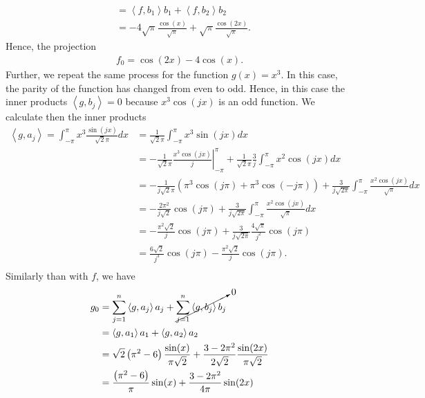 \begin{questions}
\begin{solution}
\begin{align*}
&=\left<f,b_1\right>b_1+\left<f,b_2\right>b_2\\
&=-4\sqrt{\pi}\frac{\cos(x)}{\sqrt{\pi}}+\sqrt{\pi}\frac{\cos(2x)}{\sqrt{\pi}}.
\end{align*}
Hence, the projection
\begin{align*}
f_0=\cos(2x)-4\cos(x).
\end{align*}
Further, we repeat the same process for the function $g(x)=x^3$. In this case, the parity of the function has changed from even to odd. Hence, in this case the inner products $\left<g,b_j\right>=0$ because $x^3\cos(jx)$ is an odd function.
We calculate then the inner products
\begin{align*}
\left<g,a_j\right>=\int_{-\pi}^{\pi}x^3\frac{\sin(jx)}{\sqrt{2}\pi}dx&=\frac{1}{\sqrt{2}\pi}\int_{-\pi}^{\pi}x^3\sin(jx)dx\\
&=-\frac{1}{\sqrt{2}\pi}\left.\frac{x^3\cos(jx)}{j}\right|_{-\pi}^{\pi}+\frac{1}{\sqrt{2}\pi}\frac{3}{j}\int_{-\pi}^{\pi}x^2\cos(jx)dx\\
&=-\frac{1}{j\sqrt{2}\pi}\left(\pi^3\cos(j\pi)+\pi^3\cos(-j\pi)\right)+\frac{3}{j\sqrt{2\pi}}\int_{-\pi}^{\pi}\frac{x^2\cos(jx)}{\sqrt{\pi}} dx\\
&=-\frac{2\pi^2}{j\sqrt{2}}\cos(j\pi)+\frac{3}{j\sqrt{2\pi}}\int_{-\pi}^{\pi}\frac{x^2\cos(jx)}{\sqrt{\pi}} dx\\
&=-\frac{\pi^2\sqrt{2}}{j}\cos(j\pi)+\frac{3}{j\sqrt{2\pi}}\frac{4\sqrt{\pi}}{j^2}\cos(j\pi)\\
&=\frac{6\sqrt{2}}{j^3}\cos(j\pi)-\frac{\pi^2\sqrt{2}}{j}\cos(j\pi).\\
\end{align*}
Similarly than with $f$, we have
\begin{align*}
g_0&=\sum_{j=1}^n\left<g,a_j\right>a_j+\cancelto{0}{\sum_{j=1}^n\left<g,b_j\right>b_j}\\
&=\left<g,a_1\right>a_1+\left<g,a_2\right>a_2\\
&=\sqrt{2}\left(\pi^2-6\right)\frac{\sin(x)}{\pi\sqrt{2}}+\frac{3-2\pi^2}{2\sqrt{2}}\frac{\sin(2x)}{\pi\sqrt{2}}\\
&=\frac{\left(\pi^2-6\right)}{\pi}\sin(x)+\frac{3-2\pi^2}{4\pi}\sin(2x)
\end{align*}
\end{solution}
\end{questions}
